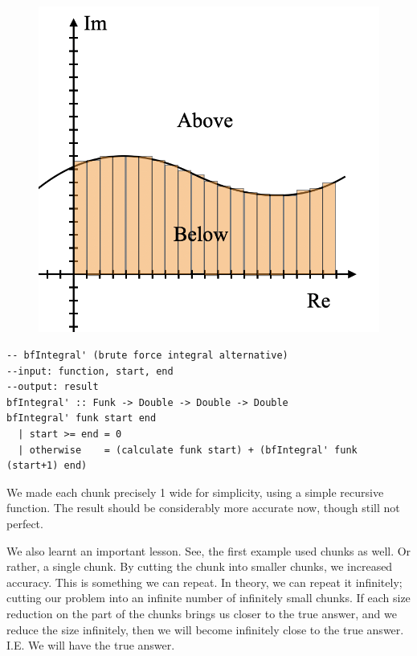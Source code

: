\begin{figure}[h!]
    \centering
    \includegraphics[scale= 0.5]{Images/integralBruteForce.png}
    \caption{}
    \label{integralbruteforce}
\end{figure}

\begin{verbatim}
-- bfIntegral' (brute force integral alternative)
--input: function, start, end
--output: result
bfIntegral' :: Funk -> Double -> Double -> Double
bfIntegral' funk start end
  | start >= end = 0
  | otherwise    = (calculate funk start) + (bfIntegral' funk (start+1) end)
\end{verbatim}
We made each chunk precisely 1 wide for simplicity, using a simple recursive function. The result should be considerably more accurate now, though still not perfect.

We also learnt an important lesson. See, the first example used chunks as well. Or rather, a single chunk. By cutting the chunk into smaller chunks, we increased accuracy. This is something we can repeat. In theory, we can repeat it infinitely; cutting our problem into an infinite number of infinitely small chunks. If each size reduction on the part of the chunks brings us closer to the true answer, and we reduce the size infinitely, then we will become infinitely close to the true answer. I.E. We will have the true answer.

